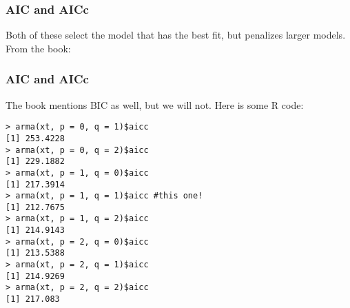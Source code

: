 \documentclass{beamer}
\begin{document}

\begin{frame}[fragile]
\frametitle{AIC and AICc}

Both of these select the model that has the best fit, but penalizes larger models. From the book:
\newline



\end{frame}



\begin{frame}[fragile]
\frametitle{AIC and AICc}

The book mentions BIC as well, but we will not. 
Here is some R code:
\begin{verbatim}
> arma(xt, p = 0, q = 1)$aicc
[1] 253.4228
> arma(xt, p = 0, q = 2)$aicc
[1] 229.1882
> arma(xt, p = 1, q = 0)$aicc
[1] 217.3914
> arma(xt, p = 1, q = 1)$aicc #this one!
[1] 212.7675
> arma(xt, p = 1, q = 2)$aicc
[1] 214.9143
> arma(xt, p = 2, q = 0)$aicc
[1] 213.5388
> arma(xt, p = 2, q = 1)$aicc
[1] 214.9269
> arma(xt, p = 2, q = 2)$aicc
[1] 217.083
\end{verbatim}

\end{frame}
\end{document}
